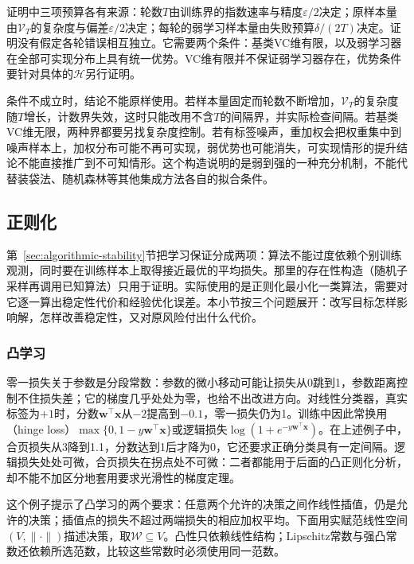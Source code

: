 证明中三项预算各有来源：轮数$T$由训练界的指数速率与精度$\varepsilon/2$决定；原样本量由$\mathcal V_T$的复杂度与偏差$\varepsilon/2$决定；每轮的弱学习样本量由失败预算$\delta/(2T)$决定。证明没有假定各轮错误相互独立。它需要两个条件：基类VC维有限，以及弱学习器在全部可实现分布上具有统一优势。VC维有限并不保证弱学习器存在，优势条件要针对具体的$\mathcal H$另行证明。

条件不成立时，结论不能原样使用。若样本量固定而轮数不断增加，$\mathcal V_T$的复杂度随$T$增长，计数界失效，这时只能改用不含$T$的间隔界，并实际检查间隔。若基类VC维无限，两种界都要另找复杂度控制。若有标签噪声，重加权会把权重集中到噪声样本上，加权分布可能不再可实现，弱优势也可能消失，可实现情形的提升结论不能直接推广到不可知情形。这个构造说明的是弱到强的一种充分机制，不能代替装袋法、随机森林等其他集成方法各自的拟合条件。

\subsection{正则化}
\label{sec:regularized-learning}

第~\ref{sec:algorithmic-stability}节把学习保证分成两项：算法不能过度依赖个别训练观测，同时要在训练样本上取得接近最优的平均损失。那里的存在性构造（随机子采样再调用已知算法）只用于证明。实际使用的是正则化最小化一类算法，需要对它逐一算出稳定性代价和经验优化误差。本小节按三个问题展开：改写目标怎样影响解，怎样改善稳定性，又对原风险付出什么代价。

\subsubsection{凸学习}
\label{sec:convex-learning-problem}

零一损失关于参数是分段常数：参数的微小移动可能让损失从0跳到1，参数距离控制不住损失差；它的梯度几乎处处为零，也给不出改进方向。对线性分类器，真实标签为$+1$时，分数$\bm w^\top\bm x$从$-2$提高到$-0.1$，零一损失仍为1。训练中因此常换用（hinge loss）$\max\{0,1-y\bm w^\top\bm x\}$或逻辑损失$\log(1+e^{-y\bm w^\top\bm x})$。在上述例子中，合页损失从3降到1.1，分数达到1后才降为0，它还要求正确分类具有一定间隔。逻辑损失处处可微，合页损失在拐点处不可微：二者都能用于后面的凸正则化分析，却不能不加区分地套用要求光滑性的梯度定理。

这个例子提示了凸学习的两个要求：任意两个允许的决策之间作线性插值，仍是允许的决策；插值点的损失不超过两端损失的相应加权平均。下面用实赋范线性空间$(V,\|\cdot\|)$描述决策，取$\mathcal W\subseteq V$。凸性只依赖线性结构；Lipschitz常数与强凸常数还依赖所选范数，比较这些常数时必须使用同一范数。

